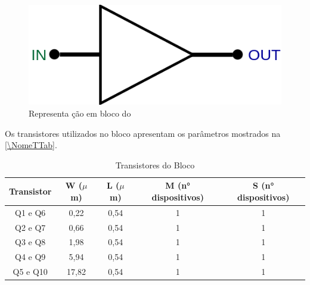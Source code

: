 \begin{figure}[htb]
 \label{NomePFig}
 \centering
    \centering
    \caption{Representa ção em bloco do \NomeBloco} \label{NomeSFig2}
    \includegraphics[scale=0.3]{Circuitos/Buffer_block.png}
\end{figure}


Os transistores utilizados no bloco \NomeBloco{} apresentam os par\^ametros mostrados na \autoref{\NomeTTab}.

\begin{table}[htb]
\caption{Transistores do Bloco \NomeBloco}
\label{\NomeTTab}
\centering
\begin{tabular}{ccccc}
\toprule
Transistor & W ($\mu$m)  & L ($\mu$m)           & M (n° dispositivos) & S (n° dispositivos)\\
\midrule \midrule
Q1 e Q6 & 0,22 & 0,54 & 1 & 1\\
\midrule
Q2 e Q7 & 0,66 & 0,54 & 1 & 1\\
\midrule
Q3 e Q8 & 1,98 & 0,54 & 1 & 1\\
\midrule
Q4 e Q9 & 5,94 & 0,54 & 1 & 1\\
\midrule
Q5 e Q10 & 17,82 & 0,54 & 1 & 1\\
\bottomrule
\end{tabular}
\end{table}